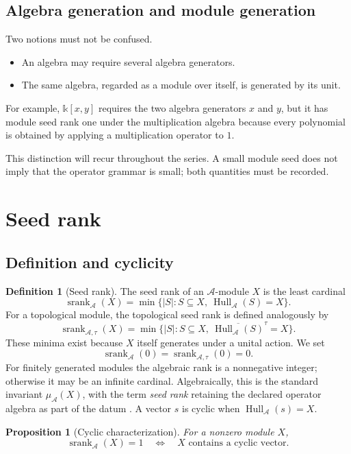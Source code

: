 \documentclass[11pt]{article}
\newtheorem{proposition}[theorem]{Proposition}
\theoremstyle{definition}
\newtheorem{definition}[theorem]{Definition}
\theoremstyle{remark}
\newcommand{\cA}{\mathcal A}
\newcommand{\Hull}{\operatorname{Hull}}
\newcommand{\srank}{\operatorname{srank}}
\newcommand{\bbk}{\mathbb{k}}
\newcommand{\closure}[1]{\overline{#1}}
\begin{document}
\subsection{Algebra generation and module generation}

Two notions must not be confused.

\begin{itemize}
\item An algebra may require several algebra generators.
\item The same algebra, regarded as a module over itself, is generated by its unit.
\end{itemize}

For example, $\bbk[x,y]$ requires the two algebra generators $x$ and $y$, but it has module seed rank one under the multiplication algebra because every polynomial is obtained by applying a multiplication operator to $1$.

This distinction will recur throughout the series. A small module seed does not imply that the operator grammar is small; both quantities must be recorded.

\section{Seed rank}

\subsection{Definition and cyclicity}

\begin{definition}[Seed rank]
The seed rank of an $\cA$-module $X$ is the least cardinal
\[
{
\srank_{\cA}(X)
=
\min\bigl\{|S|:S\subseteq X,\ \Hull_{\cA}(S)=X\bigr\}.
}
\]
For a topological module, the topological seed rank is defined analogously by
\[
\srank_{\cA,\tau}(X)
=
\min\bigl\{|S|:S\subseteq X,\ \closure{\Hull_{\cA}(S)}^{\tau}=X\bigr\}.
\]
These minima exist because $X$ itself generates under a unital action. We set
\[
\srank_{\cA}(0)=\srank_{\cA,\tau}(0)=0.
\]
For finitely generated modules the algebraic rank is a nonnegative integer; otherwise it may be an infinite cardinal. Algebraically, this is the standard invariant $\mu_{\cA}(X)$, with the term \emph{seed rank} retaining the declared operator algebra as part of the datum \cite{lam1999modules}.
A vector $s$ is cyclic when $\Hull_{\cA}(s)=X$.
\end{definition}

\begin{proposition}[Cyclic characterization]
\label{prop:cyclic-characterization}
For a nonzero module $X$,
\[
\srank_{\cA}(X)=1
\quad\Longleftrightarrow\quad
X\text{ contains a cyclic vector.}
\]
\end{proposition}
\end{document}
